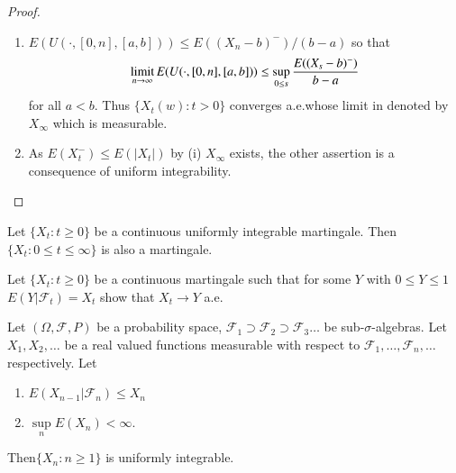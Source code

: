 \begin{proof}
\begin{enumerate}
\renewcommand{\theenumi}{\roman{enumi}}
\renewcommand{\labelenumi}{(\theenumi)}
\item $E(U(\cdot,[0,n],[a,b]))\leq E((X_{n}-b)^{-})/(b-a)$ so that
$$
\operatorname*{limit}\limits_{n\to \infty}E(U(\cdot,[0,n],[a,b]))\leq
\sup\limits_{0\leq s}\frac{E((X_{s}-b)^{-})}{b-a}
$$
for all $a<b$. Thus $\{X_{t}(w):t>0\}$ converges a.e.\@ whose limit in
denoted by $X_{\infty}$ which is measurable.

\item As $E(X^{-}_{t})\leq E(|X_{t}|)$ by (i) $X_{\infty}$ exists, the
  other assertion is a consequence of uniform integrability.
\end{enumerate}
\end{proof}

\begin{coro*}
Let $\{X_{t}:t\geq 0\}$ be a continuous uniformly integrable
martingale. Then $\{X_{t}:0\leq t\leq \infty\}$ is also a martingale.
\end{coro*}

\begin{exer*}
Let $\{X_{t}:t\geq 0\}$ be a continuous martingale such that for some
$Y$ with $0\leq Y\leq 1$ $E(Y|\mathscr{F}_{t})=X_{t}$ show that
$X_{t}\to Y$ a.e.
\end{exer*}

\begin{lemma*}
Let $(\Omega,\mathscr{F},P)$ be a probability space,
$\mathscr{F}_{1}\supset \mathscr{F}_{2}\supset \mathscr{F}_{3}\ldots$
be sub-$\sigma$-algebras. Let $X_{1},X_{2},\ldots$ be a real valued
functions measurable with respect to
$\mathscr{F}_{1},\ldots,\mathscr{F}_{n},\ldots$ respectively. Let
\begin{enumerate}
\renewcommand{\theenumi}{\roman{enumi}}
\renewcommand{\labelenumi}{\rm(\theenumi)}
\item $E(X_{n-1}|\mathscr{F}_{n})\leq X_{n}$

\item $\sup\limits_{n}E(X_{n})<\infty$.
\end{enumerate}

Then\pageoriginale $\{X_{n}:n\geq 1\}$ is uniformly integrable.
\end{lemma*}

